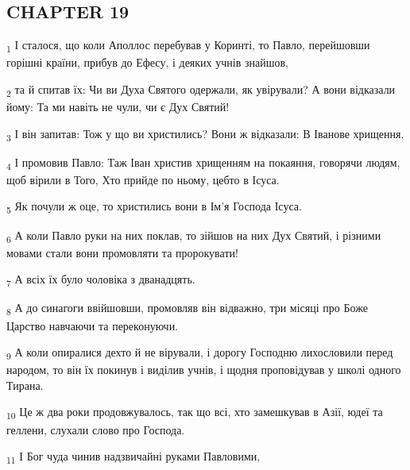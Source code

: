 \subsection{CHAPTER 19}
\begin{tcolorbox}
\textsubscript{1} І сталося, що коли Аполлос перебував у Коринті, то Павло, перейшовши горішні країни, прибув до Ефесу, і деяких учнів знайшов,
\end{tcolorbox}
\begin{tcolorbox}
\textsubscript{2} та й спитав їх: Чи ви Духа Святого одержали, як увірували? А вони відказали йому: Та ми навіть не чули, чи є Дух Святий!
\end{tcolorbox}
\begin{tcolorbox}
\textsubscript{3} І він запитав: Тож у що ви христились? Вони ж відказали: В Іванове хрищення.
\end{tcolorbox}
\begin{tcolorbox}
\textsubscript{4} І промовив Павло: Таж Іван христив хрищенням на покаяння, говорячи людям, щоб вірили в Того, Хто прийде по ньому, цебто в Ісуса.
\end{tcolorbox}
\begin{tcolorbox}
\textsubscript{5} Як почули ж оце, то христились вони в Ім'я Господа Ісуса.
\end{tcolorbox}
\begin{tcolorbox}
\textsubscript{6} А коли Павло руки на них поклав, то зійшов на них Дух Святий, і різними мовами стали вони промовляти та пророкувати!
\end{tcolorbox}
\begin{tcolorbox}
\textsubscript{7} А всіх їх було чоловіка з дванадцять.
\end{tcolorbox}
\begin{tcolorbox}
\textsubscript{8} А до синагоги ввійшовши, промовляв він відважно, три місяці про Боже Царство навчаючи та переконуючи.
\end{tcolorbox}
\begin{tcolorbox}
\textsubscript{9} А коли опиралися дехто й не вірували, і дорогу Господню лихословили перед народом, то він їх покинув і виділив учнів, і щодня проповідував у школі одного Тирана.
\end{tcolorbox}
\begin{tcolorbox}
\textsubscript{10} Це ж два роки продовжувалось, так що всі, хто замешкував в Азії, юдеї та геллени, слухали слово про Господа.
\end{tcolorbox}
\begin{tcolorbox}
\textsubscript{11} І Бог чуда чинив надзвичайні руками Павловими,
\end{tcolorbox}

